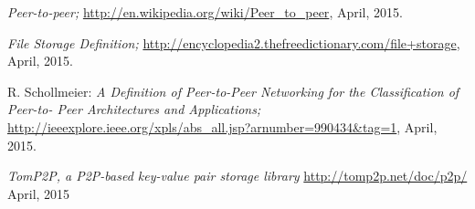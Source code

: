 \begin{thebibliography}{99}
		\emph{Peer-to-peer;}
		\url{http://en.wikipedia.org/wiki/Peer_to_peer},
		April, 2015.
		
		\emph{File Storage Definition;}
		\url{http://encyclopedia2.thefreedictionary.com/file+storage},
		April, 2015.
		
		R. Schollmeier:
		\emph{A Definition of Peer-to-Peer Networking for the Classification of Peer-to- Peer Architectures and Applications;}
		\url{http://ieeexplore.ieee.org/xpls/abs_all.jsp?arnumber=990434&tag=1},
		April, 2015.
		
		\emph{TomP2P, a P2P-based key-value pair storage library}
		\url{http://tomp2p.net/doc/p2p/}
		April, 2015

\end{thebibliography}